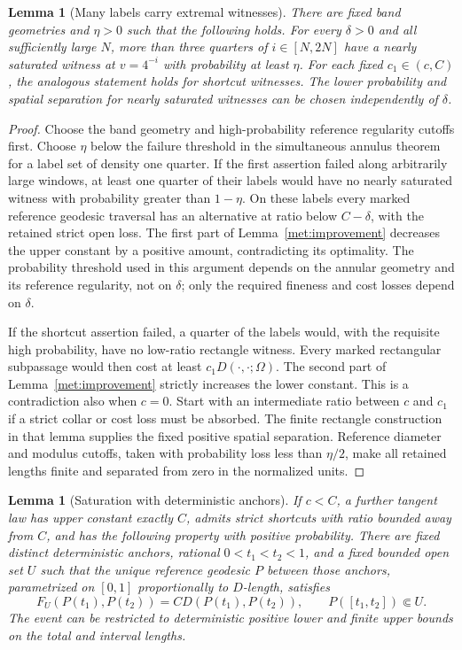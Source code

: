 \documentclass[11pt]{article}
\numberwithin{equation}{section}
\newtheorem{lemma}[theorem]{Lemma}
\theoremstyle{definition}
\theoremstyle{remark}
\newcommand{\1}{\mathbf 1}
\begin{document}
\begin{lemma}[Many labels carry extremal witnesses]
\label{met:extremal-labels}
There are fixed band geometries and $\eta>0$ such that the following
holds.  For every $\delta>0$ and all sufficiently large $N$, more than
three quarters of $i\in[N,2N]$ have a nearly saturated witness at
$v=4^{-i}$ with probability at least $\eta$.  For each fixed
$c_1\in(c,C)$, the analogous statement holds for shortcut witnesses.
The lower probability and spatial separation for nearly saturated
witnesses can be chosen independently of $\delta$.
\end{lemma}

\begin{proof}
Choose the band geometry and high-probability reference regularity
cutoffs first.  Choose $\eta$ below the failure threshold in the
simultaneous annulus theorem for a label set of density one quarter.
If the first assertion failed along arbitrarily large windows, at
least one quarter of their labels would have no nearly saturated
witness with probability greater than $1-\eta$.  On these labels every
marked reference geodesic traversal has an alternative at ratio below
$C-\delta$, with the retained strict open loss.  The first part of
Lemma~\ref{met:improvement} decreases the upper constant by a positive
amount, contradicting its optimality.  The probability threshold used
in this argument depends on the annular geometry and its reference
regularity, not on $\delta$; only the required fineness and cost losses
depend on $\delta$.

If the shortcut assertion failed, a quarter of the labels would, with
the requisite high probability, have no low-ratio rectangle witness.
Every marked rectangular subpassage would then cost at least
$c_1D(\cdot,\cdot;\Omega)$.  The second part of
Lemma~\ref{met:improvement} strictly increases the lower constant.
This is a contradiction also when $c=0$.  Start with an intermediate
ratio between $c$ and $c_1$ if a strict collar or cost loss must be
absorbed.  The finite rectangle construction in that lemma supplies
the fixed positive spatial separation.  Reference diameter and
modulus cutoffs, taken with probability loss less than $\eta/2$, make
all retained lengths finite and separated from zero in the normalized
units.
\end{proof}

\begin{lemma}[Saturation with deterministic anchors]
\label{met:dense-anchors}
If $c<C$, a further tangent law has upper constant exactly $C$,
admits strict shortcuts with ratio bounded away from $C$, and has the
following property with positive probability.  There are fixed
distinct deterministic anchors, rational $0<t_1<t_2<1$, and a fixed
bounded open set $U$ such that the unique reference geodesic $P$
between those anchors, parametrized on $[0,1]$ proportionally to
$D$-length, satisfies
\begin{equation}
 F_U(P(t_1),P(t_2))
   =C D(P(t_1),P(t_2)),\qquad P([t_1,t_2])\Subset U.
 \label{met:saturated}
\end{equation}
The event can be restricted to deterministic positive lower and
finite upper bounds on the total and interval lengths.
\end{lemma}
\end{document}
